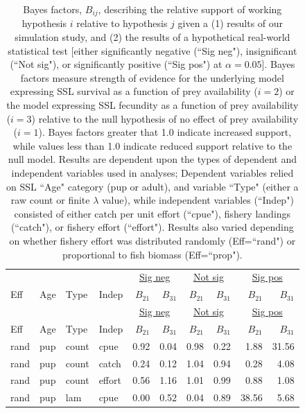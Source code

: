 \documentclass[nonumbib,leqno]{nrc1}
\begin{document}
\begin{longtable}{llllrrrrrr}
\caption[Sim1]{ \large Bayes factors, $B_{ij}$, describing the relative support of working hypothesis $i$ relative to hypothesis $j$ given a (1) results of our simulation study, and (2) the results of a hypothetical real-world statistical test [either significantly negative (``Sig neg"), insignificant (``Not sig"), or significantly positive (``Sig pos") at $\alpha=0.05$]. Bayes factors measure strength of evidence for the underlying model expressing SSL survival as a function of prey availability ($i=2$) or the model expressing SSL fecundity as a function of prey availability ($i=3$) relative to the null hypothesis of no effect of prey availability ($i=1$).  Bayes factors greater that 1.0 indicate increased support, while values less than 1.0 indicate reduced support relative to the null model.  Results are dependent upon the types of dependent and independent variables used in analyses; Dependent variables relied on SSL ``Age" category (pup or adult), and variable ``Type" (either a raw count or finite $\lambda$ value), while independent variables (``Indep") consisted of either catch per unit effort (``cpue"), fishery landings (``catch"), or fishery effort (``effort").  Results also varied depending on whether fishery effort was distributed randomly (Eff=``rand") or proportional to fish biomass (Eff=``prop").}
\label{tab:BF} \\
\hline \hline
    & & & & \multicolumn{2}{c}{\underline{Sig neg}} & \multicolumn{2}{c}{\underline{Not sig}} & \multicolumn{2}{c}{\underline{Sig pos}} \\
Eff & Age & Type & Indep & $B_{21}$ & $B_{31}$ & $B_{21}$ & $B_{31}$ & $B_{21}$ & $B_{31}$ \\
  \hline
\endfirsthead
\hline \hline
     & & & & \multicolumn{2}{c}{\underline{Sig neg}} & \multicolumn{2}{c}{\underline{Not sig}} & \multicolumn{2}{c}{\underline{Sig pos}} \\
Eff & Age & Type & Indep & $B_{21}$ & $B_{31}$ & $B_{21}$ & $B_{31}$ & $B_{21}$ & $B_{31}$ \\
  \hline
\endhead
\hline
\endfoot
\hline
\endlastfoot
rand & pup & count & cpue & 0.92 & 0.04 & 0.98 & 0.22 & 1.88 & 31.56 \\
  rand & pup & count & catch & 0.24 & 0.12 & 1.04 & 0.94 & 0.28 & 4.08 \\
  rand & pup & count & effort & 0.56 & 1.16 & 1.01 & 0.99 & 0.88 & 1.08 \\
  rand & pup & lam & cpue & 0.00 & 0.52 & 0.04 & 0.89 & 38.56 & 5.68 \\

\end{longtable}
\end{document}
